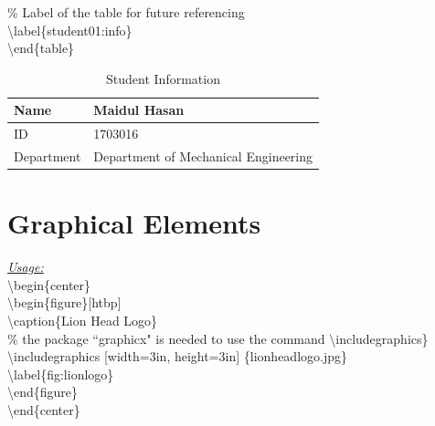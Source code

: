 \documentclass[12pt, twocolumn]{article}
\begin{document}
\noindent \% Label of the table for future referencing \\
\textbackslash label\{student01:info\} \\
\textbackslash end\{table\} \\
\begin{center} \big\Downarrow \end{center}

\begin{table}[htbp]
\caption{Student Information}

\begin{center}
 \begin{tabular}{|l|p{4.7cm}|}
  \hline
  Name & Maidul Hasan \\
  \hline
  ID & 1703016 \\
  \hline
  Department & Department of Mechanical Engineering \\
  \hline
 \end{tabular}
\end{center}

\label{student01:info}
\end{table}


\section{Graphical Elements}

\underline{\textit{Usage:}} \\

\textbackslash begin\{center\} \\
 \hspace*{6mm} \textbackslash begin\{figure\}[htbp] \\
 \hspace*{6mm} \textbackslash caption\{Lion Head Logo\} \\
 \hspace*{6mm} \% the package ``graphicx" is needed to use the command \textbackslash includegraphics\} \\
 \hspace*{5.5mm} \textbackslash includegraphics [width=3in, height=3in] \{lion\textunderscore head\textunderscore logo.jpg\} \\
 \hspace*{6mm} \textbackslash label\{fig:lionlogo\} \\
 \hspace*{6mm} \textbackslash end\{figure\} \\
 \noindent \textbackslash end\{center\} \\
 
\end{document}
